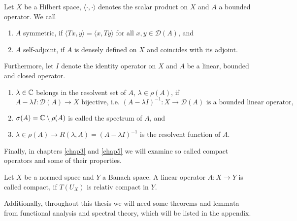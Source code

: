 \begin{definition}
Let $X$ be a Hilbert space, $\langle \cdot, \cdot \rangle$ denotes the scalar product on $X$ and $A$ a bounded operator. We call
	\begin{enumerate}[label=\alph*\upshape)]
		\item $A$ symmetric, if $\langle Tx,y \rangle = \langle x ,Ty \rangle$ for all $x,y \in \mathcal{D}(A)$, and
		\item $A$ self-adjoint, if $A$ is densely defined on $X$ and coincides with its adjoint.
	\end{enumerate}
	
\end{definition}

\begin{definition}
Furthermore, let $I$ denote the identity operator on $X$ and $A$ be a linear, bounded and closed operator.
	\begin{enumerate}[label=\alph*\upshape)]
		\item $\lambda \in \mathbb{C}$ belongs in the resolvent set of $A$, $\lambda \in \rho(A)$, if
			\[  A  - \lambda I \colon \mathcal{D}(A) \rightarrow X \text{ bijective, i.e. } (A - \lambda I)^{-1} \colon X \rightarrow \mathcal{D}(A) \text{ is a bounded linear operator,} \]
		\item $\sigma(A) = \mathbb{C} \setminus \rho(A)$ is called the spectrum of $A$, and
		\item $\lambda \in \rho(A) \rightarrow R(\lambda, A) = (A - \lambda I)^{-1}$ is the resolvent function of $A$.
	\end{enumerate}		
\end{definition}

Finally, in chapters \ref{chap3} and \ref{chap5} we will examine so called compact operators and some of their properties.

\begin{definition}
	Let $X$ be a normed space and $Y$ a Banach space. A linear operator $A \colon X \rightarrow Y$ is called compact, if $T(U_{X})$ is relativ compact in $Y$.
\end{definition}

Additionally, throughout this thesis we will need some theorems and lemmata from functional analysis and spectral theory, which will be listed in the appendix.